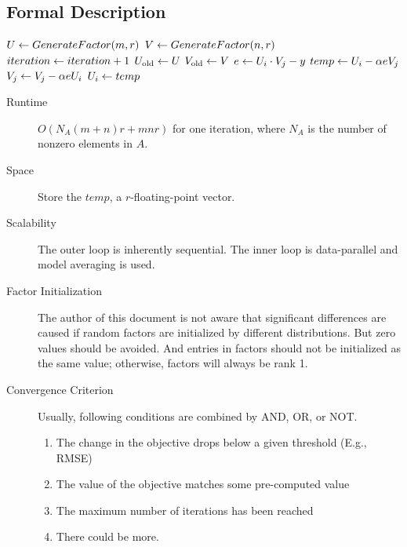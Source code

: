 \subsection{Formal Description}
\begin{algorithm} \label{alg:lmf-igd}
\begin{algorithmic}[1]
	\State $U \leftarrow GenerateFactor(m, r)$
	\State $V \leftarrow GenerateFactor(n, r)$
	\Repeat
		\State $iteration \leftarrow iteration + 1$
		\State $U_\text{old} \leftarrow U$
		\State $V_\text{old} \leftarrow V$
		 
			\State $e \leftarrow U_i \cdot V_j - y$
			\State $temp \leftarrow U_i - \alpha e V_j$
			\State $V_j \leftarrow V_j - \alpha e U_i$ 
			\State $U_i \leftarrow temp$ 
		\EndFor
\end{algorithmic}
\end{algorithm}

\begin{description}
	\item[Runtime] $O(N_{A} (m + n) r + m n r)$ for one iteration,
        where $N_{A}$ is the number of nonzero elements in $A$.

	\item[Space] Store the $temp$, a $r$-floating-point vector.

	\item[Scalability] The outer loop is inherently sequential.
        The inner loop is data-parallel and model averaging 
        \cite{DBLP:conf/nips/DuchiAW10} is used.

    \item[Factor Initialization] The author of this document is not aware that
        significant differences are caused if random factors are initialized
        by different distributions. But zero values should be avoided. And
        entries in factors should not be initialized as the same value;
        otherwise, factors will always be rank 1.

    \item[Convergence Criterion] Usually, following conditions are combined by
        AND, OR, or NOT.
        \begin{enumerate}
            \item The change in the objective drops below a given threshold
                (E.g., RMSE)
            \item The value of the objective matches some pre-computed value
            \item The maximum number of iterations has been reached
            \item There could be more.
        \end{enumerate}
\end{description}

